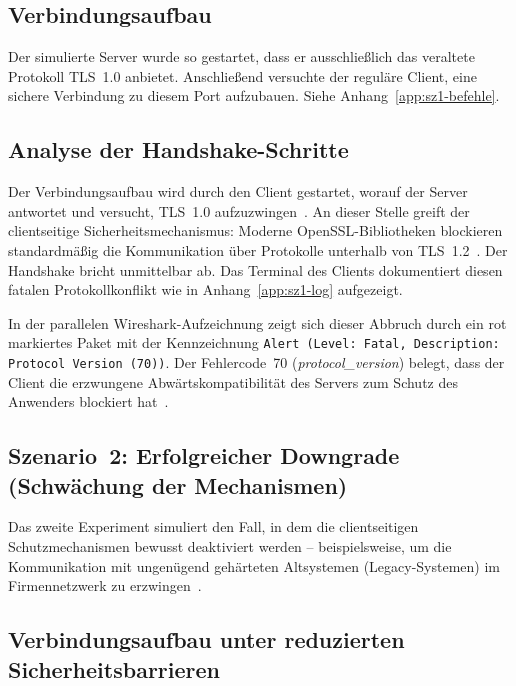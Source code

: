 \subsection*{Verbindungsaufbau}

Der simulierte Server wurde so gestartet, dass er ausschließlich das veraltete Protokoll
TLS~1.0 anbietet. Anschließend versuchte der reguläre Client, eine sichere Verbindung
zu diesem Port aufzubauen. Siehe Anhang~\ref{app:sz1-befehle}.

\subsection*{Analyse der Handshake-Schritte}

Der Verbindungsaufbau wird durch den Client gestartet, worauf der Server antwortet und
 versucht, TLS~1.0 aufzuzwingen~\cite{rfc8446}. An dieser Stelle greift der
clientseitige Sicherheitsmechanismus: Moderne OpenSSL-Bibliotheken blockieren
standardmäßig die Kommunikation über Protokolle unterhalb von TLS~1.2~\cite{openssl}.
Der Handshake bricht unmittelbar ab. Das Terminal des Clients dokumentiert diesen fatalen
Protokollkonflikt wie in Anhang~\ref{app:sz1-log} aufgezeigt.

In der parallelen Wireshark-Aufzeichnung zeigt sich dieser Abbruch durch ein rot
markiertes Paket mit der Kennzeichnung
\texttt{Alert (Level: Fatal, Description: Protocol Version (70))}.
Der Fehlercode~70 (\textit{protocol\_version}) belegt, dass der Client die erzwungene
Abwärtskompatibilität des Servers zum Schutz des Anwenders blockiert
 hat~\cite{openssl}.

\subsection{Szenario~2: Erfolgreicher Downgrade (Schwächung der Mechanismen)}

Das zweite Experiment simuliert den Fall, in dem die clientseitigen Schutzmechanismen
bewusst deaktiviert werden -- beispielsweise, um die Kommunikation mit ungenügend
gehärteten Altsystemen (Legacy-Systemen) im Firmennetzwerk zu
erzwingen~\cite{sentinelone}.

\subsection*{Verbindungsaufbau unter reduzierten Sicherheitsbarrieren}

